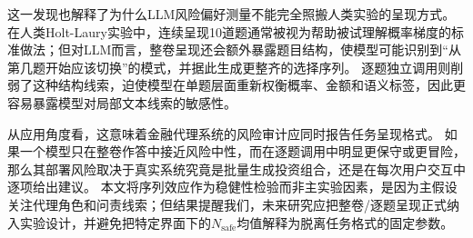 这一发现也解释了为什么LLM风险偏好测量不能完全照搬人类实验的呈现方式。
在人类Holt-Laury实验中，连续呈现10道题通常被视为帮助被试理解概率梯度的标准做法；但对LLM而言，整卷呈现还会额外暴露题目结构，使模型可能识别到“从第几题开始应该切换”的模式，并据此生成更整齐的选择序列。
逐题独立调用则削弱了这种结构线索，迫使模型在单题层面重新权衡概率、金额和语义标签，因此更容易暴露模型对局部文本线索的敏感性。

从应用角度看，这意味着金融代理系统的风险审计应同时报告任务呈现格式。
如果一个模型只在整卷作答中接近风险中性，而在逐题调用中明显更保守或更冒险，那么其部署风险取决于真实系统究竟是批量生成投资组合，还是在每次用户交互中逐项给出建议。
本文将序列效应作为稳健性检验而非主实验因素，是因为主假设关注代理角色和问责线索；但结果提醒我们，未来研究应把整卷/逐题呈现正式纳入实验设计，并避免把特定界面下的$N_{\text{safe}}$均值解释为脱离任务格式的固定参数。



\FloatBarrier
